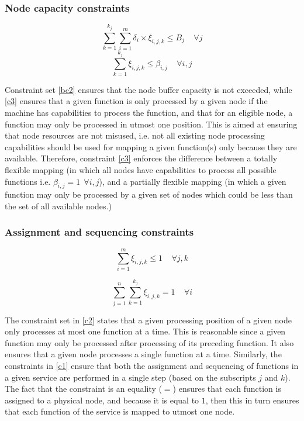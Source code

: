 \documentclass[conference]{IEEEtran}
\begin{document}
\subsubsection{Node capacity constraints}
\begin{equation}
\sum\limits_{k=1}^{k_j} \sum\limits_{i=1}^{m} \delta_{i} \times \xi_{i,j,k} \leq B_j \ \ \ \ \   \forall j
\label{bc2}
\end{equation}
\begin{equation}
\sum\limits_{k=1}^{k_j}  \xi_{i,j,k} \leq \beta_{i,j} \ \ \ \ \   \forall i, j
\label{c3}
\end{equation}


Constraint set \eqref{bc2} ensures that the node buffer capacity is not exceeded, while \eqref{c3} ensures that a given function is only processed by a given node if the machine has capabilities to process the function, and that for an eligible node, a function may only be processed in utmost one position. This is aimed at ensuring that node resources are not misused, i.e. not all existing node processing capabilities should be used for mapping a given function(s) only because they are available. Therefore, constraint \eqref{c3} enforces the difference between a totally flexible mapping (in which all nodes have capabilities to process all possible functions i.e. $\beta_{i,j} = 1 \ \ \forall i, j$), and a partially flexible mapping (in which a given function may only be processed by a given set of nodes which could be less than the set of all available nodes.)

\subsubsection{Assignment and sequencing constraints}
\begin{equation}
\sum\limits_{i=1}^{m} \xi_{i,j,k} \leq 1 \ \ \ \ \   \forall j, k
\label{c2}
\end{equation}

\begin{equation}
\sum\limits_{j=1}^n \sum\limits_{k=1}^{k_j} \xi_{i,j,k} = 1 \ \ \ \ \   \forall i
\label{c1}
\end{equation}

The constraint set in \eqref{c2} states that a given processing position of a given node only processes at most one function 
at a time. This is reasonable since a given function may only be processed after processing of its preceding function. It also ensures that a given node processes a single function at a time. Similarly, the constraints in \eqref{c1} ensure that both the assignment and sequencing of functions in a given service are performed in a single step (based on the subscripts $j$ and $k$). The fact that the constraint is an equality ($=$) ensures that each function is assigned to a physical node, and because it is equal to $1$, then this in turn ensures that each function of the service is mapped to utmost one node.
\end{document}
